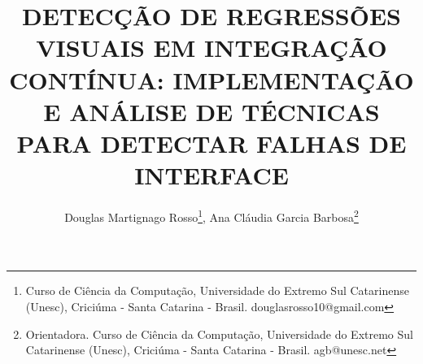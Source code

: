 \documentclass{UNESC}
\title{DETECÇÃO DE REGRESSÕES VISUAIS EM INTEGRAÇÃO CONTÍNUA: IMPLEMENTAÇÃO E ANÁLISE DE TÉCNICAS PARA DETECTAR FALHAS DE INTERFACE}
\author
{
   Douglas Martignago Rosso\footnote{Curso de Ciência da Computação, Universidade do Extremo Sul Catarinense (Unesc), Criciúma - Santa Catarina - Brasil. douglasrosso10@gmail.com},
   Ana Cláudia Garcia Barbosa\footnote{Orientadora. Curso de Ciência da Computação, Universidade do Extremo Sul Catarinense (Unesc), Criciúma - Santa Catarina - Brasil. agb@unesc.net}
}
\begin{document}
\onehalfspacing

\maketitle







\end{document}
